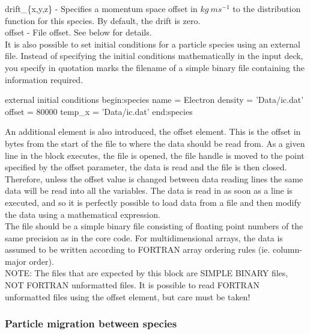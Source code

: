 {\emphtext drift\_\{x,y,z\}} - Specifies a momentum space offset in
$kg\ ms^{-1}$ to the distribution function for this species. By default,
the drift is zero.\\

{\emphtext offset} - File offset. See below for details.\\


It is also possible to set initial conditions for a particle species
using an external file.  Instead of specifying the
initial conditions mathematically in the input deck, you specify in quotation
marks the filename of a simple binary file containing the information required.
\begin{lboxverbatim}{external initial conditions}
begin:species
   name = Electron
   density = 'Data/ic.dat'
   offset = 80000
   temp_x = 'Data/ic.dat'
end:species
\end{lboxverbatim}


An additional element is also introduced, the offset element. This
is the offset in bytes from the start of the file to where the data should
be read from. As a given line in the block executes, the file is opened, the
file handle is moved to the point specified by the offset parameter, the data
is read and the file is then closed. Therefore, unless the offset value is
changed between data reading lines the same data will be read into all the
variables. The data is read in as soon as a line is executed, and so it is
perfectly possible to load data from a file and then modify the data using
a mathematical expression.\\

The file should be a simple binary file consisting of floating point numbers of
the same precision as  in the core {\EPOCH} code. For
multidimensional arrays, the data is assumed to be written according to
FORTRAN array ordering rules (ie. column-major order).\\

{\emphtext NOTE: The files that are expected by this block are SIMPLE BINARY
files, NOT FORTRAN unformatted files. It is possible to read FORTRAN
unformatted files using the offset element, but care must be taken!}

\subsubsection{Particle migration between species}
\label{sec:migration}

